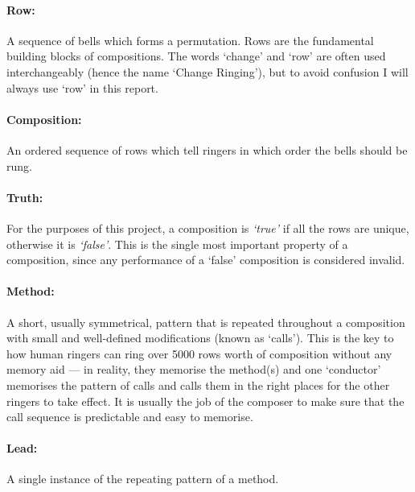 \documentclass[12pt]{article}
\begin{document}
\paragraph{Row:} A sequence of bells which forms a permutation.  Rows are the fundamental building
blocks of compositions.  The words `change' and `row' are often used interchangeably (hence the name
`Change Ringing'), but to avoid confusion I will always use `row' in this report.

\paragraph{Composition:} An ordered sequence of rows which tell ringers in which order the bells
should be rung.

\paragraph{Truth:} For the purposes of this project, a composition is \emph{`true'} if all the rows
are unique, otherwise it is \emph{`false'}.  This is the single most important property of a
composition, since any performance of a `false' composition is considered invalid.

\paragraph{Method:} A short, usually symmetrical, pattern that is repeated throughout a composition
with small and well-defined modifications (known as `calls').  This is the key to how human ringers
can ring over 5000 rows worth of composition without any memory aid --- in reality, they memorise
the method(s) and one `conductor' memorises the pattern of calls and calls them in the right places
for the other ringers to take effect.  It is usually the job of the composer to make sure that the
call sequence is predictable and easy to memorise.

\paragraph{Lead:} A single instance of the repeating pattern of a method.
\end{document}
